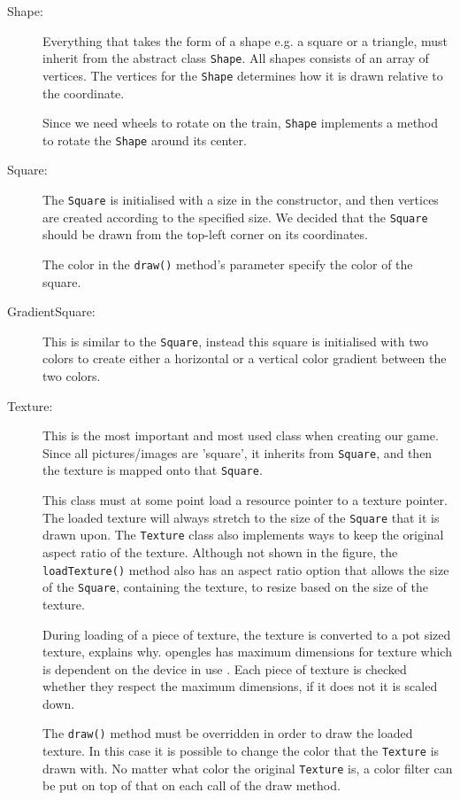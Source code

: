 \begin{description}
\item[Shape:] Everything that takes the form of a shape e.g. a square or a triangle, must inherit from the abstract class \lstinline|Shape|. All shapes consists of an array of vertices. The vertices for the \lstinline|Shape| determines how it is drawn relative to the coordinate.

Since we need wheels to rotate on the train, \lstinline|Shape| implements a method to rotate the \lstinline|Shape| around its center.

\item[Square:] The \lstinline|Square| is initialised with a size in the constructor, and then vertices are created according to the specified size. We decided that the \lstinline|Square| should be drawn from the top-left corner on its coordinates.

The color in the \lstinline|draw()| method's parameter specify the color of the square.

\item[GradientSquare:] This is similar to the \lstinline|Square|, instead this square is initialised with two colors to create either a horizontal or a vertical color gradient between the two colors.

\item[Texture:] This is the most important and most used class when creating our game. Since all pictures/images are 'square', it inherits from \lstinline|Square|, and then the texture is mapped onto that \lstinline|Square|.

This class must at some point load a resource pointer to a texture pointer. The loaded texture will always stretch to the size of the \lstinline|Square| that it is drawn upon. The \lstinline|Texture| class also implements ways to keep the original aspect ratio of the texture. Although not shown in the figure, the \lstinline|loadTexture()| method also has an aspect ratio option that allows the size of the \lstinline|Square|, containing the texture, to resize based on the size of the texture.

During loading of a piece of texture, the texture is converted to a \acf{pot} sized texture,  explains why. \ac{opengles} has maximum dimensions for texture which is dependent on the device in use \citep{glutils}. Each piece of texture is checked whether they respect the maximum dimensions, if it does not it is scaled down.

The \lstinline|draw()| method must be overridden in order to draw the loaded texture. In this case it is possible to change the color that the \lstinline|Texture| is drawn with. No matter what color the original \lstinline|Texture| is, a color filter can be put on top of that on each call of the draw method.


\end{description}
